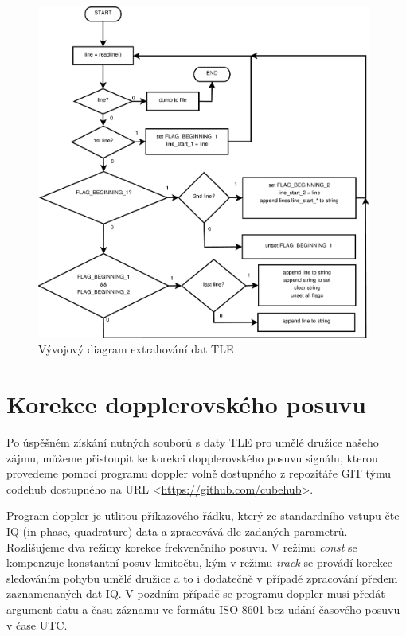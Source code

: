 %  
  \begin{figure}[ht]
    \centering
    \includegraphics[width=0.98\textwidth]{./obrazky/TLE.pdf}
    \caption{Vývojový diagram extrahování dat TLE}
    \label{fig:TLE_flow}
  \end{figure}

\chapter{Korekce dopplerovského posuvu}
  Po úspěšném získání nutných souborů s daty TLE pro umělé družice našeho zájmu, můžeme přistoupit ke korekci dopplerovského posuvu signálu, kterou provedeme pomocí programu doppler volně dostupného z repozitáře GIT týmu codehub dostupného na URL <\url{https://github.com/cubehub}>.

  Program doppler je utlitou příkazového řádku, který ze standardního vstupu čte IQ (in-phase, quadrature) data a zpracovává dle zadaných parametrů. Rozlišujeme dva režimy korekce frekvenčního posuvu. V režimu \emph{const} se kompenzuje konstantní posuv kmitočtu, kým v režimu \emph{track} se provádí korekce sledováním pohybu umělé družice a to i dodatečně v případě zpracování předem zaznamenaných dat IQ. V pozdním případě se programu doppler musí předát argument datu a času záznamu ve formátu ISO 8601 \cite{wiki:timeISO} \cite{github:doppler} bez udání časového posuvu v čase UTC.

